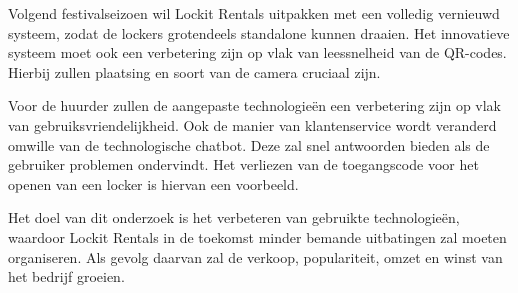 \documentclass[dutch,dit,thesis]{hogentreport}
\begin{document}
Volgend festivalseizoen wil Lockit Rentals uitpakken met een volledig vernieuwd systeem, zodat de lockers grotendeels standalone kunnen draaien. Het innovatieve systeem moet ook een verbetering zijn op vlak van leessnelheid van de QR-codes. Hierbij zullen plaatsing en soort van de camera cruciaal zijn. 

Voor de huurder zullen de aangepaste technologieën een verbetering zijn op vlak van gebruiksvriendelijkheid. Ook de manier van klantenservice wordt veranderd omwille van de technologische chatbot. Deze zal snel antwoorden bieden als de gebruiker problemen ondervindt. Het verliezen van de toegangscode voor het openen van een locker is hiervan een voorbeeld.

Het doel van dit onderzoek is het verbeteren van gebruikte technologieën, waardoor Lockit Rentals in de toekomst minder bemande uitbatingen zal moeten organiseren. Als gevolg daarvan zal de verkoop, populariteit, omzet en winst van het bedrijf groeien.



%


\backmatter{}

\setlength\bibitemsep{2pt} %
\printbibliography[heading=bibintoc]
\end{document}
